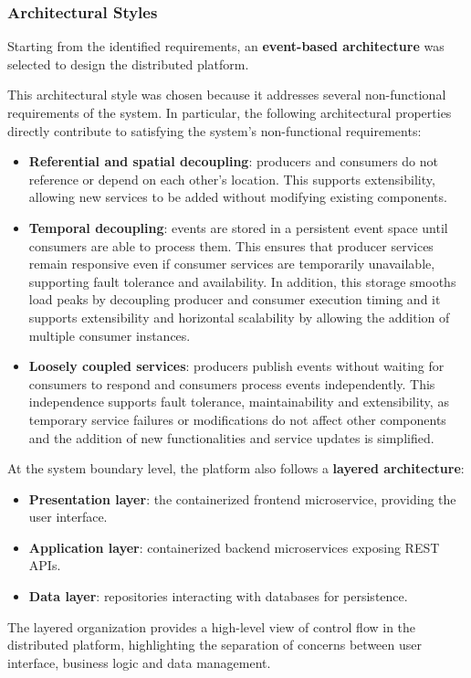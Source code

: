 \subsubsection{Architectural Styles}

Starting from the identified requirements, an \textbf{event-based architecture} was selected to design the distributed platform.

This architectural style was chosen because it addresses several non-functional requirements of the system. In particular, the following architectural properties directly contribute to satisfying the system's non-functional requirements:

\begin{itemize}
  \item \textbf{Referential and spatial decoupling}: producers and consumers do not reference or depend on each other's location. This supports extensibility, allowing new services to be added without modifying existing components.
  \item \textbf{Temporal decoupling}: events are stored in a persistent event space until consumers are able to process them. This ensures that producer services remain responsive even if consumer services are temporarily unavailable, supporting fault tolerance and availability. In addition, this storage smooths load peaks by decoupling producer and consumer execution timing and it supports extensibility and horizontal scalability by allowing the addition of multiple consumer instances.
  \item \textbf{Loosely coupled services}: producers publish events without waiting for consumers to respond and consumers process events independently. This independence supports fault tolerance, maintainability and extensibility, as temporary service failures or modifications do not affect other components and the addition of new functionalities and service updates is simplified.
\end{itemize}

At the system boundary level, the platform also follows a \textbf{layered architecture}:

\begin{itemize}
  \item \textbf{Presentation layer}: the containerized frontend microservice, providing the user interface.
  \item \textbf{Application layer}: containerized backend microservices exposing REST APIs.
  \item \textbf{Data layer}: repositories interacting with databases for persistence.
\end{itemize}

The layered organization provides a high-level view of control flow in the distributed platform, highlighting the separation of concerns between user interface, business logic and data management.
